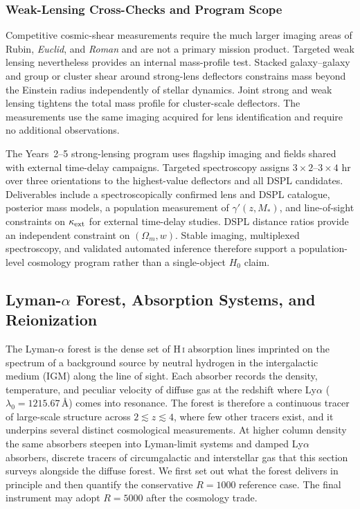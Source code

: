 \subsubsection{Weak-Lensing Cross-Checks and Program Scope}

Competitive cosmic-shear measurements require the much larger imaging areas of Rubin, \textit{Euclid}, and \textit{Roman} and are not a primary mission product. Targeted weak lensing nevertheless provides an internal mass-profile test. Stacked galaxy--galaxy and group or cluster shear around strong-lens deflectors constrains mass beyond the Einstein radius independently of stellar dynamics. Joint strong and weak lensing tightens the total mass profile for cluster-scale deflectors. The measurements use the same imaging acquired for lens identification and require no additional observations.

The Years~2--5 strong-lensing program uses flagship imaging and fields shared with external time-delay campaigns. Targeted spectroscopy assigns $3\times2$--$3\times4$ hr over three orientations to the highest-value deflectors and all DSPL candidates. Deliverables include a spectroscopically confirmed lens and DSPL catalogue, posterior mass models, a population measurement of $\gamma'(z,M_\ast)$, and line-of-sight constraints on $\kappa_{\rm ext}$ for external time-delay studies. DSPL distance ratios provide an independent constraint on $(\Omega_m,w)$. Stable imaging, multiplexed spectroscopy, and validated automated inference therefore support a population-level cosmology program rather than a single-object $H_0$ claim.

\subsection{Lyman-\texorpdfstring{$\alpha$}{alpha} Forest, Absorption Systems, and Reionization}\label{sec:lyaforest}

The Lyman-$\alpha$ forest is the dense set of H\,\textsc{i} absorption lines imprinted on the spectrum of a background source by neutral hydrogen in the intergalactic medium (IGM) along the line of sight. Each absorber records the density, temperature, and peculiar velocity of diffuse gas at the redshift where Ly$\alpha$ ($\lambda_0=1215.67$\,\AA) comes into resonance. The forest is therefore a continuous tracer of large-scale structure across $2\lesssim z\lesssim4$, where few other tracers exist, and it underpins several distinct cosmological measurements. At higher column density the same absorbers steepen into Lyman-limit systems and damped Ly$\alpha$ absorbers, discrete tracers of circumgalactic and interstellar gas that this section surveys alongside the diffuse forest. We first set out what the forest delivers in principle and then quantify the conservative $R=1000$ reference case. The final instrument may adopt $R=5000$ after the cosmology trade.

